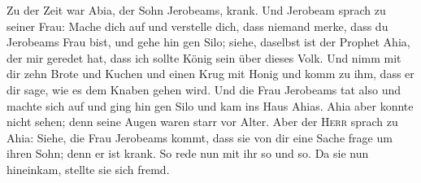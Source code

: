  Zu der Zeit war Abia, der Sohn Jerobeams, krank.
 Und Jerobeam sprach zu seiner Frau: Mache dich auf und
verstelle dich, dass niemand merke, dass du Jerobeams Frau bist, und
gehe hin gen Silo; siehe, daselbst ist der Prophet Ahia, der mir geredet
hat, dass ich sollte König sein über dieses Volk.  Und
nimm mit dir zehn Brote und Kuchen und einen Krug mit Honig und komm zu
ihm, dass er dir sage, wie es dem Knaben gehen wird.  Und
die Frau Jerobeams tat also und machte sich auf und ging hin gen Silo
und kam ins Haus Ahias. Ahia aber konnte nicht sehen; denn seine Augen
waren starr vor Alter.  Aber der \textsc{Herr} sprach zu
Ahia: Siehe, die Frau Jerobeams kommt, dass sie von dir eine Sache frage
um ihren Sohn; denn er ist krank. So rede nun mit ihr so und so. Da sie
nun hineinkam, stellte sie sich fremd.

